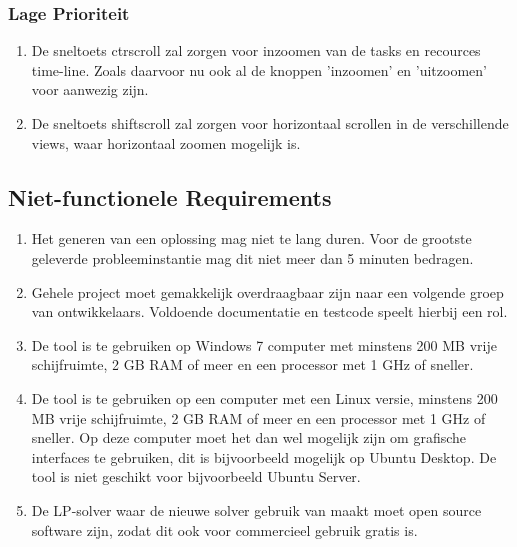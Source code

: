 \subsubsection*{Lage Prioriteit}
\begin{enumerate}[resume]
    \item De sneltoets ctr\plus  scroll zal zorgen voor inzoomen van de tasks en recources time-line. Zoals daarvoor nu ook al de knoppen 'inzoomen' en 'uitzoomen' voor aanwezig zijn. 
    \item De sneltoets shift\plus scroll zal zorgen voor horizontaal scrollen in de verschillende views, waar horizontaal zoomen mogelijk is.
\end{enumerate}

\subsection{Niet-functionele Requirements}
\begin{enumerate}
    \item Het generen van een oplossing mag niet te lang duren. Voor de grootste geleverde probleeminstantie mag dit niet meer dan 5 minuten bedragen.
    \item Gehele project moet gemakkelijk overdraagbaar zijn naar een volgende groep van ontwikkelaars. Voldoende documentatie en testcode speelt hierbij een rol.
    \item De tool is te gebruiken op Windows 7 computer met minstens 200 MB vrije schijfruimte, 2 GB RAM of meer en een processor met 1 GHz of sneller.
    \item De tool is te gebruiken op een computer met een Linux versie, minstens 200 MB vrije schijfruimte, 2 GB RAM of meer en een processor met 1 GHz of sneller. Op deze computer moet het dan wel mogelijk zijn om grafische interfaces te gebruiken, dit is bijvoorbeeld mogelijk op Ubuntu Desktop. De tool is niet geschikt voor bijvoorbeeld Ubuntu Server. 
    \item De LP-solver waar de nieuwe solver gebruik van maakt moet open source software zijn, zodat dit ook voor commercieel gebruik gratis is. 
\end{enumerate}
